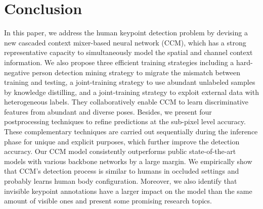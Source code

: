 \documentclass[twocolumn]{svjour3}          \smartqed  \usepackage{natbib}
\begin{document}
\section{Conclusion}
In this paper, we address the human keypoint detection problem by devising a new cascaded context mixer-based neural network (CCM), which has a strong representative capacity to simultaneously model the spatial and channel context information. We also propose three efficient training strategies including a hard-negative person detection mining strategy to migrate the mismatch between training and testing, a joint-training strategy to use abundant unlabeled samples by knowledge distilling, and a joint-training strategy to exploit external data with heterogeneous labels. They collaboratively enable CCM to learn discriminative features from abundant and diverse poses. Besides, we present four postprocessing techniques to refine predictions at the sub-pixel level accuracy. These complementary techniques are carried out sequentially during the inference phase for unique and explicit purposes, which further improve the detection accuracy. Our CCM model consistently outperforms public state-of-the-art models with various backbone networks by a large margin. We empirically show that CCM’s detection process is similar to humans in occluded settings and probably learns human body configuration. Moreover, we also identify that invisible keypoint annotations have a larger impact on the model than the same amount of visible ones and present some promising research topics.










         
\end{document}
